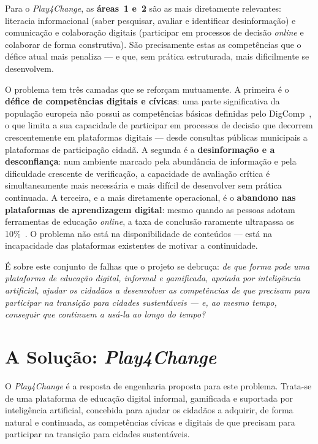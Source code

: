 Para o \emph{Play4Change}, as \textbf{áreas~1 e~2} são as mais diretamente relevantes: literacia informacional (saber pesquisar, avaliar e identificar desinformação) e comunicação e colaboração digitais (participar em processos de decisão \emph{online} e colaborar de forma construtiva). São precisamente estas as competências que o défice atual mais penaliza --- e que, sem prática estruturada, mais dificilmente se desenvolvem.

O problema tem três camadas que se reforçam mutuamente. A primeira é o \textbf{défice de competências digitais e cívicas}: uma parte significativa da população europeia não possui as competências básicas definidas pelo DigComp~\cite{vuorikari2022digcomp}, o que limita a sua capacidade de participar em processos de decisão que decorrem crescentemente em plataformas digitais --- desde consultas públicas municipais a plataformas de participação cidadã. A segunda é a \textbf{desinformação e a desconfiança}: num ambiente marcado pela abundância de informação e pela dificuldade crescente de verificação, a capacidade de avaliação crítica é simultaneamente mais necessária e mais difícil de desenvolver sem prática continuada. A terceira, e a mais diretamente operacional, é o \textbf{abandono nas plataformas de aprendizagem digital}: mesmo quando as pessoas adotam ferramentas de educação \emph{online}, a taxa de conclusão raramente ultrapassa os 10\%~\cite{kasneci2023chatgpt}. O problema não está na disponibilidade de conteúdos --- está na incapacidade das plataformas existentes de motivar a continuidade.

É sobre este conjunto de falhas que o projeto se debruça: \emph{de que forma pode uma plataforma de educação digital, informal e gamificada, apoiada por inteligência artificial, ajudar os cidadãos a desenvolver as competências de que precisam para participar na transição para cidades sustentáveis --- e, ao mesmo tempo, conseguir que continuem a usá-la ao longo do tempo?}

\section{A Solução: \emph{Play4Change}}
\label{sec:solucao}

O \emph{Play4Change} é a resposta de engenharia proposta para este problema. Trata-se de uma plataforma de educação digital informal, gamificada e suportada por inteligência artificial, concebida para ajudar os cidadãos a adquirir, de forma natural e continuada, as competências cívicas e digitais de que precisam para participar na transição para cidades sustentáveis.


